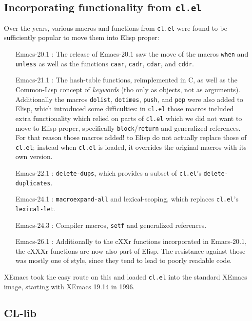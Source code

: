 \documentclass[format=acmsmall, review=false, screen=true]{acmart}
\newcommand \Elisp {Elisp}
\begin{document}
\subsection{Incorporating functionality from \texttt{cl.el}}

Over the years, various macros and functions from \texttt{cl.el} were found
to be sufficiently popular to move them into \Elisp{} proper:

\begin{itemize}
\item [Emacs-20.1]: The release of Emacs-20.1 saw the move of the macros
  \texttt{when} and \texttt{unless} as well as the functions \texttt{caar},
  \texttt{cadr}, \texttt{cdar}, and \texttt{cddr}.
\item [Emacs-21.1]: The hash-table functions, reimplemented in C, as well as
  the Common-Lisp concept of \emph{keywords} (tho only as objects, not as
  arguments).  Additionally the macros \texttt{dolist}, \texttt{dotimes},
  \texttt{push}, and \texttt{pop} were also added to \Elisp{}, which
  introduced some difficulties: in \texttt{cl.el} those macros included
  extra functionality which relied on parts of \texttt{cl.el} which we did
  not want to move to \Elisp{} proper, specifically
  \texttt{block}/\texttt{return} and generalized references.  For that
  reason those macros added! to \Elisp{} do not actually replace those of
  \texttt{cl.el}; instead when \texttt{cl.el} is loaded, it overrides the
  original macros with its own version.
\item [Emacs-22.1]: \texttt{delete-dups}, which provides a subset of
  \texttt{cl.el}'s \texttt{delete-duplicates}.
\item [Emacs-24.1]: \texttt{macroexpand-all} and lexical-scoping, which
  replaces \texttt{cl.el}'s \texttt{lexical-let}.
\item [Emacs-24.3]: Compiler macros, \texttt{setf} and
  generalized references.
\item [Emacs-26.1]: Additionally to the cXXr functions incorporated in
  Emacs-20.1, the cXXXr functions are now also part of \Elisp{}.
  The resistance against those was mostly one of style, since they tend to
  lead to poorly readable code.
\end{itemize}
%
XEmacs took the easy route on this and loaded \texttt{cl.el} into the
standard XEmacs image, starting with XEmacs 19.14 in 1996.

\subsection{CL-lib}          %
\end{document}
